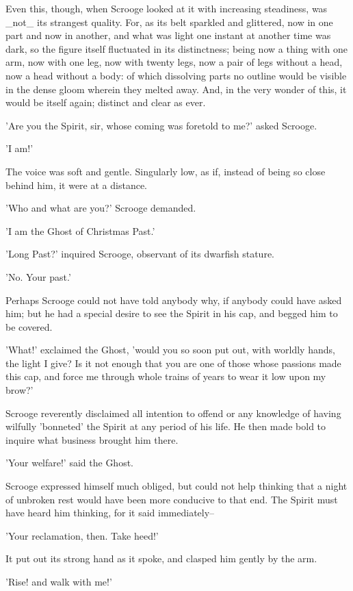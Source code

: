 Even this, though, when Scrooge looked at it with increasing steadiness,
was _not_ its strangest quality. For, as its belt sparkled and
glittered, now in one part and now in another, and what was light one
instant at another time was dark, so the figure itself fluctuated in its
distinctness; being now a thing with one arm, now with one leg, now with
twenty legs, now a pair of legs without a head, now a head without a
body: of which dissolving parts no outline would be visible in the dense
gloom wherein they melted away. And, in the very wonder of this, it
would be itself again; distinct and clear as ever.

'Are you the Spirit, sir, whose coming was foretold to me?' asked
Scrooge.

'I am!'

The voice was soft and gentle. Singularly low, as if, instead of being
so close behind him, it were at a distance.

'Who and what are you?' Scrooge demanded.

'I am the Ghost of Christmas Past.'

'Long Past?' inquired Scrooge, observant of its dwarfish stature.

'No. Your past.'

Perhaps Scrooge could not have told anybody why, if anybody could have
asked him; but he had a special desire to see the Spirit in his cap,
and begged him to be covered.

'What!' exclaimed the Ghost, 'would you so soon put out, with worldly
hands, the light I give? Is it not enough that you are one of those
whose passions made this cap, and force me through whole trains of years
to wear it low upon my brow?'

Scrooge reverently disclaimed all intention to offend or any knowledge
of having wilfully 'bonneted' the Spirit at any period of his life. He
then made bold to inquire what business brought him there.

'Your welfare!' said the Ghost.

Scrooge expressed himself much obliged, but could not help thinking that
a night of unbroken rest would have been more conducive to that end. The
Spirit must have heard him thinking, for it said immediately--

'Your reclamation, then. Take heed!'

It put out its strong hand as it spoke, and clasped him gently by the
arm.

'Rise! and walk with me!'

